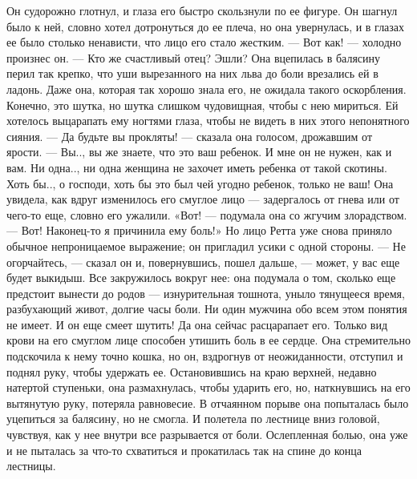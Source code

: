 Он судорожно глотнул, и глаза его быстро скользнули по ее фигуре. Он шагнул было к ней, словно хотел дотронуться до ее плеча, но она увернулась, и в глазах ее было столько ненависти, что лицо его стало жестким.
— Вот как! — холодно произнес он. — Кто же счастливый отец? Эшли?
Она вцепилась в балясину перил так крепко, что уши вырезанного на них льва до боли врезались ей в ладонь. Даже она, которая так хорошо знала его, не ожидала такого оскорбления. Конечно, это шутка, но шутка слишком чудовищная, чтобы с нею мириться. Ей хотелось выцарапать ему ногтями глаза, чтобы не видеть в них этого непонятного сияния.
— Да будьте вы прокляты! — сказала она голосом, дрожавшим от ярости. — Вы.., вы же знаете, что это ваш ребенок. И мне он не нужен, как и вам. Ни одна.., ни одна женщина не захочет иметь ребенка от такой скотины. Хоть бы.., о господи, хоть бы это был чей угодно ребенок, только не ваш!
Она увидела, как вдруг изменилось его смуглое лицо — задергалось от гнева или от чего-то еще, словно его ужалили.
«Вот! — подумала она со жгучим злорадством. — Вот! Наконец-то я причинила ему боль!» Но лицо Ретта уже снова приняло обычное непроницаемое выражение; он пригладил усики с одной стороны.
— Не огорчайтесь, — сказал он и, повернувшись, пошел дальше, — может, у вас еще будет выкидыш.
Все закружилось вокруг нее: она подумала о том, сколько еще предстоит вынести до родов — изнурительная тошнота, уныло тянущееся время, разбухающий живот, долгие часы боли. Ни один мужчина обо всем этом понятия не имеет. И он еще смеет шутить! Да она сейчас расцарапает его. Только вид крови на его смуглом лице способен утишить боль в ее сердце. Она стремительно подскочила к нему точно кошка, но он, вздрогнув от неожиданности, отступил и поднял руку, чтобы удержать ее. Остановившись на краю верхней, недавно натертой ступеньки, она размахнулась, чтобы ударить его, но, наткнувшись на его вытянутую руку, потеряла равновесие. В отчаянном порыве она попыталась было уцепиться за балясину, но не смогла. И полетела по лестнице вниз головой, чувствуя, как у нее внутри все разрывается от боли. Ослепленная болью, она уже и не пыталась за что-то схватиться и прокатилась так на спине до конца лестницы.




